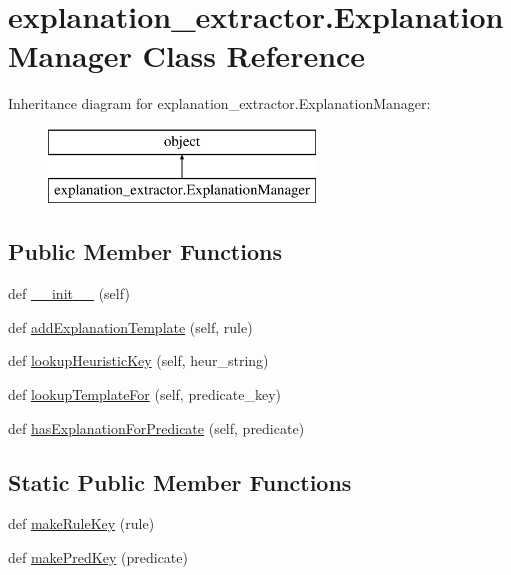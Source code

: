 \hypertarget{classexplanation__extractor_1_1_explanation_manager}{}\section{explanation\+\_\+extractor.\+Explanation\+Manager Class Reference}
\label{classexplanation__extractor_1_1_explanation_manager}
Inheritance diagram for explanation\+\_\+extractor.\+Explanation\+Manager\+:\begin{figure}[H]
\begin{center}
\leavevmode
\includegraphics[height=2.000000cm]{classexplanation__extractor_1_1_explanation_manager}
\end{center}
\end{figure}
\subsection*{Public Member Functions}
\begin{DoxyCompactItemize}
\item 
def \hyperlink{classexplanation__extractor_1_1_explanation_manager_a200693544d5c773571a0c0068a428439}{\+\_\+\+\_\+init\+\_\+\+\_\+} (self)
\item 
def \hyperlink{classexplanation__extractor_1_1_explanation_manager_a595b2b449442a170122c2526a78ed3fd}{add\+Explanation\+Template} (self, rule)
\item 
def \hyperlink{classexplanation__extractor_1_1_explanation_manager_a11bc69dcaf562b5107f353692969ac25}{lookup\+Heuristic\+Key} (self, heur\+\_\+string)
\item 
def \hyperlink{classexplanation__extractor_1_1_explanation_manager_a13d8dadd73b2acfa1ad2b4ffee9c6d39}{lookup\+Template\+For} (self, predicate\+\_\+key)
\item 
def \hyperlink{classexplanation__extractor_1_1_explanation_manager_a42a90b38813341194d28bb718b62de83}{has\+Explanation\+For\+Predicate} (self, predicate)
\end{DoxyCompactItemize}
\subsection*{Static Public Member Functions}
\begin{DoxyCompactItemize}
\item 
def \hyperlink{classexplanation__extractor_1_1_explanation_manager_a04299eda21809209efe46537820daf41}{make\+Rule\+Key} (rule)
\item 
def \hyperlink{classexplanation__extractor_1_1_explanation_manager_ae4bf9fd7c6fe136b02d1700bcfff3f52}{make\+Pred\+Key} (predicate)
\end{DoxyCompactItemize}
